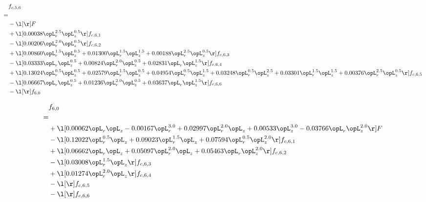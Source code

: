 \begin{alignat}{2} 
\label{eq:f_56_2} 
& f_{c,5,6} \nonumber \\ 
 = \\ 
& - \l[  \r] F \nonumber \\ 
& + \l[  0.00038 \opL_r^{2.5} \opL_z^{0.5}  \r] f_{c,6,1} \nonumber \\ 
& - \l[  0.00206 \opL_r^{2.0} \opL_z^{0.5}  \r] f_{c,6,2} \nonumber \\ 
& + \l[  0.00860 \opL_r^{1.5} \opL_z^{0.5} +  0.01300 \opL_r^{1.5} \opL_z^{1.5} +  0.00188 \opL_r^{2.5} \opL_z^{0.5}  \r] f_{c,6,3} \nonumber \\ 
& - \l[  0.03333 \opL_r \opL_z^{0.5} +  0.00824 \opL_r^{2.0} \opL_z^{0.5} +  0.02831 \opL_r \opL_z^{1.5}  \r] f_{c,6,4} \nonumber \\ 
& + \l[  0.13024 \opL_r^{0.5} \opL_z^{0.5} +  0.02579 \opL_r^{1.5} \opL_z^{0.5} +  0.04954 \opL_r^{0.5} \opL_z^{1.5} +  0.03248 \opL_r^{0.5} \opL_z^{2.5} +  0.03301 \opL_r^{1.5} \opL_z^{1.5} +  0.00376 \opL_r^{2.5} \opL_z^{0.5}  \r] f_{c,6,5} \nonumber \\ 
& - \l[  0.06667 \opL_r \opL_z^{0.5} +  0.01236 \opL_r^{2.0} \opL_z^{0.5} +  0.03637 \opL_r \opL_z^{1.5}  \r] f_{c,6,6} \nonumber \\ 
& - \l[  \r] f_{6,0} \nonumber \\ 
\end{alignat} 


\begin{alignat}{2} 
\label{eq:f_60_2} 
& f_{6,0} \nonumber \\ 
 = \\ 
& + \l[  0.00062 \opL_r \opL_z   -0.00167 \opL_r^{3.0} +  0.02997 \opL_r^{2.0} \opL_z +  0.00533 \opL_z^{3.0}   -0.03766 \opL_r \opL_z^{2.0}  \r] F \nonumber \\ 
& - \l[  0.12022 \opL_r^{0.5} \opL_z +  0.09023 \opL_r^{1.5} \opL_z +  0.07594 \opL_r^{0.5} \opL_z^{2.0}  \r] f_{c,6,1} \nonumber \\ 
& + \l[  0.06662 \opL_r \opL_z +  0.05097 \opL_r^{2.0} \opL_z +  0.05463 \opL_r \opL_z^{2.0}  \r] f_{c,6,2} \nonumber \\ 
& - \l[  0.03008 \opL_r^{1.5} \opL_z  \r] f_{c,6,3} \nonumber \\ 
& + \l[  0.01274 \opL_r^{2.0} \opL_z  \r] f_{c,6,4} \nonumber \\ 
& - \l[  \r] f_{c,6,5} \nonumber \\ 
& - \l[  \r] f_{c,6,6} \nonumber \\ 
\end{alignat} 


